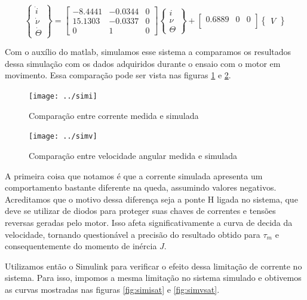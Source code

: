 \documentclass{article}
\begin{document}
\begin{equation}
\label{eq:statesval}
\begin{Bmatrix}
\dot{i}\\ \dot{\nu} \\ \dot{\Theta} 
\end{Bmatrix} =
\begin{bmatrix}
-8.4441 & -0.0344 & 0\\
15.1303 & -0.0337 & 0\\
0 & 1 & 0
\end{bmatrix}
\begin{Bmatrix}
i\\ \nu \\ \Theta 
\end{Bmatrix} + 
\begin{bmatrix}
0.6889 & 0 & 0\\
\end{bmatrix}
\begin{Bmatrix}
V 
\end{Bmatrix}
\end{equation}

Com o auxílio do matlab, simulamos esse sistema a comparamos os resultados dessa simulação com os dados adquiridos durante o ensaio com o motor em movimento. Essa comparação pode ser vista nas figuras \ref{fig:simi} e \ref{fig:simv}.
\begin{figure}[H]
	\centering
	\texttt{[image: ../simi]}
	\caption{Comparação entre corrente medida e simulada}
	\label{fig:simi}
\end{figure}
\begin{figure}[H]
	\centering
	\texttt{[image: ../simv]}
	\caption{Comparação entre velocidade angular medida e simulada}
	\label{fig:simv}
\end{figure}

A primeira coisa que notamos é que a corrente simulada apresenta um comportamento bastante diferente na queda, assumindo valores negativos. Acreditamos que o motivo dessa diferença seja a ponte H ligada no sistema, que deve se utilizar de diodos para proteger suas chaves de correntes e tensões reversas geradas pelo motor. Isso afeta significativamente a curva de decida da velocidade, tornando questionável a precisão do resultado obtido para $\tau_m$ e consequentemente do momento de inércia $J$.

Utilizamos então o Simulink para verificar o efeito dessa limitação de corrente no sistema. Para isso, impomos a mesma limitação no sistema simulado e obtivemos as curvas mostradas nas figuras \ref{fig:simisat} e \ref{fig:simvsat}.
\end{document}
